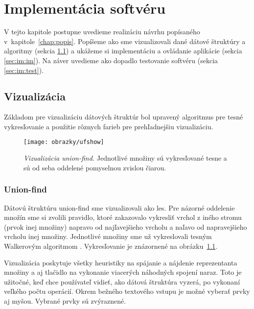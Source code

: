 \chapter{Implementácia softvéru}\label{chap:implementacia}

V tejto kapitole postupne uvedieme realizáciu návrhu popísaného 
v~kapitole~\ref{chap:popis}. Popíšeme ako sme vizualizovali dané 
dátové štruktúry a algoritmy (sekcia \ref{sec:im:vis}) a ukážeme si 
implementáciu a ovládanie aplikácie (sekcia \ref{sec:im:im}). 
Na záver uvedieme ako dopadlo testovanie softvéru (sekcia \ref{sec:im:test}).

\section{Vizualizácia}\label{sec:im:vis}

Základom pre vizualizáciu dátových štruktúr bol upravený algoritmus pre 
tesné vykresľovanie a použitie rôznych farieb pre prehľadnejšiu vizualizáciu.

\begin{figure}
\centering
\texttt{[image: obrazky/ufshow]}
\caption{\emph{Vizualizácia union-find.} Jednotlivé množiny sú vykresľované 
tesne a sú od seba oddelené pomyselnou zvislou čiarou.}
\label{img:ufshow}
\end{figure}

\subsection{Union-find}

Dátovú štruktúru union-find sme vizualizovali ako les. Pre názorné 
oddelenie množín sme si zvolili pravidlo, ktoré zakazovalo vykresliť vrchol 
z iného stromu (prvok inej množiny) 
napravo od najľavejšieho vrcholu a naľavo od napravejšieho vrcholu inej 
množiny. Jednotlivé množiny sme už vykreslovali tesným Walkerovým algoritmom 
\citep{walker}. Vykresľovanie je znázornené na obrázku~\ref{img:ufshow}.

Vizualizácia poskytuje všetky heuristiky na spájanie a 
nájdenie reprezentanta množiny a 
aj tlačidlo na vykonanie viacerých náhodných spojení naraz. Toto je užitočné, 
keď chce používateľ vidieť, ako dátová štruktúra vyzerá, po vykonaní 
veľkého počtu operácií. Okrem bežného textového vstupu je možné vyberať prvky aj myšou. 
Vybrané prvky sú zvýraznené.

